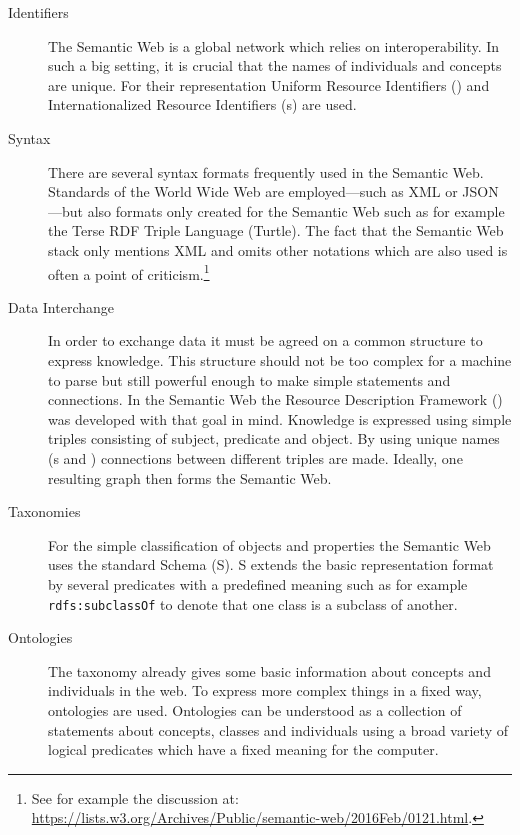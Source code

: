 \begin{description}
 \item[Identifiers] The Semantic Web is a global network which relies on interoperability. In such a big setting, it is crucial that the names of individuals and concepts are unique.
 For their representation Uniform Resource Identifiers (\uris) and Internationalized Resource Identifiers (\iri{}s) are used.  
 \item[Syntax] There are several syntax formats frequently used in the Semantic Web. Standards of the World Wide Web are employed---such as XML or JSON---but also formats 
 only created for the Semantic Web such as for example the Terse RDF Triple Language (Turtle). The fact that the Semantic Web stack only mentions XML and omits 
 other notations which are also used
 is often 
 a point of criticism.\footnote{See for example the discussion at: \url{https://lists.w3.org/Archives/Public/semantic-web/2016Feb/0121.html}.} 
 \item[Data Interchange]
In order to exchange data it must be agreed on  a common structure to express knowledge. This 
structure should not be too complex for a machine to parse but still 
powerful enough to make simple statements and connections. 
In the Semantic Web the Resource Description Framework (\rdf) was developed with 
that goal in mind. Knowledge is expressed using simple triples consisting of subject,
predicate and object. By using unique names (\iri{}s and \uris) connections between different triples are made. 
Ideally, one resulting graph then forms the Semantic Web.
 \item[Taxonomies] For the simple classification of objects and properties the Semantic Web uses the standard \rdf Schema (\rdf{}S). \rdf{}S extends the basic representation format 
 \rdf by several predicates with a predefined meaning such as for example \texttt{rdfs:subclassOf} to denote that one class is a subclass of another. 
 \item[Ontologies]
 The taxonomy already gives some basic information about concepts and individuals in the web. To express more complex things in a fixed way, ontologies are used. 
 Ontologies can be understood as a collection of statements about concepts, classes and individuals using a broad variety of logical predicates which have a fixed meaning for the computer.

\end{description}

